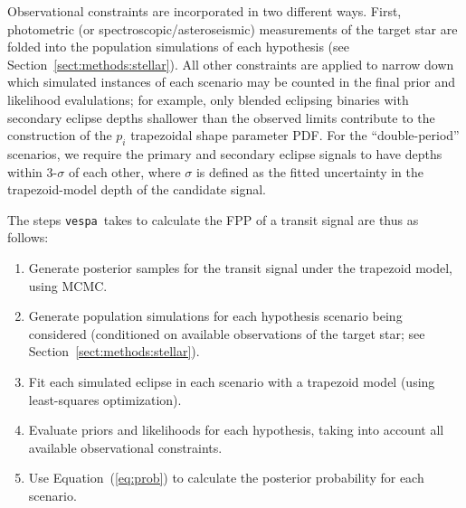 \documentclass{emulateapj}
\newcommand{\Eq}[1]{Equation~(\ref{eq:#1})}
\newcommand{\eq}[1]{\Eq{#1}}
\newcommand{\sectionname}{Section}
\newcommand{\Sect}[1]{\sectionname~\ref{sect:#1}}
\newcommand{\sect}[1]{\Sect{#1}}
\newcommand{\vespa}{\texttt{vespa}}
\begin{document}
Observational constraints are incorporated in two different ways.
First, photometric (or spectroscopic/asteroseismic) measurements of
the target star are folded into the population simulations of each
hypothesis (see \sect{methods:stellar}).  All other constraints are
applied to narrow down which simulated instances of each scenario may
be counted in the final prior and likelihood evalulations; for
example, only blended eclipsing binaries with secondary eclipse depths
shallower than the observed limits contribute to the construction of
the $p_i$ trapezoidal shape parameter PDF.  For the ``double-period''
scenarios, we require the primary and secondary eclipse signals to
have depths within 3-$\sigma$ of each other, where $\sigma$ is defined
as the fitted uncertainty in the trapezoid-model depth of the
candidate signal.

The steps \vespa\ takes to calculate the FPP of a transit signal
are thus as follows:
\begin{enumerate}
\item Generate posterior samples for the transit signal under the
  trapezoid model, using MCMC.
\item Generate population simulations for each hypothesis scenario
  being considered (conditioned on available observations of the
  target star; see \sect{methods:stellar}).
\item Fit each simulated eclipse in each scenario with a trapezoid
  model (using least-squares optimization).
\item Evaluate priors and likelihoods for each hypothesis, taking into
  account all available observational constraints.
\item Use \eq{prob} to calculate the posterior probability for each scenario.
\end{enumerate}
\end{document}
